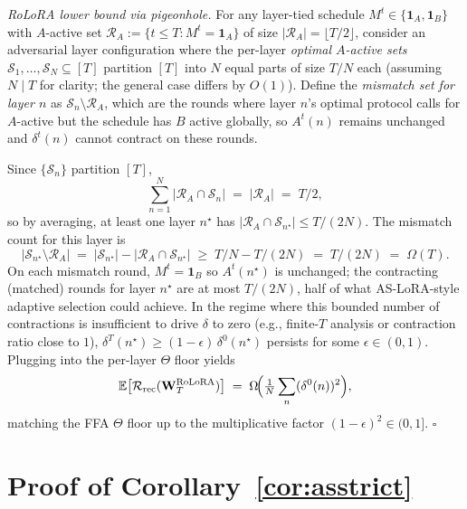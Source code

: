 \emph{RoLoRA lower bound via pigeonhole.} For any layer-tied schedule $M^t\in\{\mathbf 1_A,\mathbf 1_B\}$ with $A$-active set $\mathcal R_A:=\{t\le T:M^t=\mathbf 1_A\}$ of size $|\mathcal R_A|=\lfloor T/2\rfloor$, consider an adversarial layer configuration where the per-layer \emph{optimal $A$-active sets} $\mathcal S_1,\ldots,\mathcal S_N\subseteq[T]$ partition $[T]$ into $N$ equal parts of size $T/N$ each (assuming $N\mid T$ for clarity; the general case differs by $O(1)$). Define the \emph{mismatch set for layer $n$} as $\mathcal S_n\setminus\mathcal R_A$, which are the rounds where layer $n$'s optimal protocol calls for $A$-active but the schedule has $B$ active globally, so $A^t(n)$ remains unchanged and $\delta^t(n)$ cannot contract on these rounds.

Since $\{\mathcal S_n\}$ partition $[T]$,
\begin{equation}
\sum_{n=1}^N |\mathcal R_A\cap\mathcal S_n| \;=\; |\mathcal R_A| \;=\; T/2,
\end{equation}
so by averaging, at least one layer $n^\star$ has $|\mathcal R_A\cap\mathcal S_{n^\star}|\le T/(2N)$. The mismatch count for this layer is
\begin{equation}
|\mathcal S_{n^\star}\setminus\mathcal R_A| \;=\; |\mathcal S_{n^\star}| - |\mathcal R_A\cap\mathcal S_{n^\star}| \;\ge\; T/N - T/(2N) \;=\; T/(2N) \;=\; \Omega(T).
\end{equation}
On each mismatch round, $M^t = \mathbf 1_B$ so $A^t(n^\star)$ is unchanged; the contracting (matched) rounds for layer $n^\star$ are at most $T/(2N)$, half of what AS-LoRA-style adaptive selection could achieve. In the regime where this bounded number of contractions is insufficient to drive $\delta$ to zero (e.g., finite-$T$ analysis or contraction ratio close to $1$), $\delta^T(n^\star)\ge(1-\epsilon)\,\delta^0(n^\star)$ persists for some $\epsilon\in(0,1)$. Plugging into the per-layer $\Theta$ floor yields
\begin{equation}
\mathbb{E}\bigl[\mathcal R_\text{rec}(\mathbf W_T^\text{RoLoRA})\bigr] \;=\; \Omega\!\Bigl(\tfrac{1}{N}\sum_n (\delta^0(n))^2\Bigr),
\end{equation}
matching the FFA $\Theta$ floor up to the multiplicative factor $(1-\epsilon)^2\in(0,1]$. \hfill$\square$



\section{Proof of Corollary~\ref{cor:asstrict}}
\label{app:proof-asstrict}

